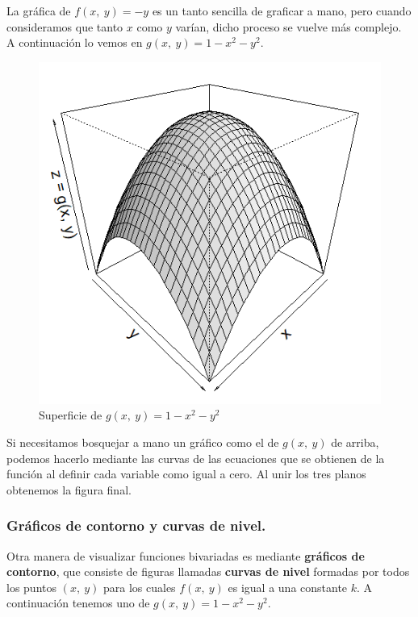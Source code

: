 \documentclass[12pt]{article}
\begin{document}
\newpage

La gráfica de $f(x, \ y) = -y$ es un tanto sencilla de graficar a mano, pero cuando consideramos que tanto $x$ como $y$ varían, dicho proceso se vuelve más complejo. A continuación lo vemos en $g(x, \ y) = 1 - x^{2} - y^{2}$.

\begin{figure}[hbt!]
\centering
\includegraphics[scale = 0.35]{superficie.png}
\caption{Superficie de $g(x, \ y) = 1 - x^{2} - y^{2}$}
\end{figure}

Si necesitamos bosquejar a mano un gráfico como el de $g(x, \ y)$ de arriba, podemos hacerlo mediante las curvas de las ecuaciones que se obtienen de la función al definir cada variable como igual a cero. Al unir los tres planos obtenemos la figura final.

\subsubsection{Gráficos de contorno y curvas de nivel.}

Otra manera de visualizar funciones bivariadas es mediante \textbf{gráficos de contorno}, que consiste de figuras llamadas \textbf{curvas de nivel} formadas por todos los puntos $(x, \ y)$ para los cuales $f(x, \ y)$ es igual a una constante $k$. A continuación tenemos uno de $g(x, \ y) = 1 - x^{2} - y^{2}$.
\end{document}
